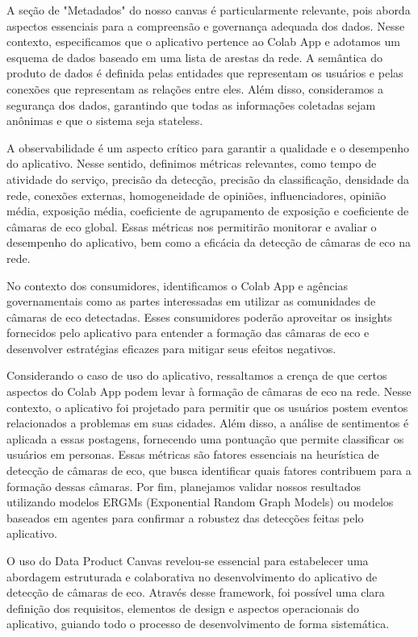A seção de "Metadados" do nosso canvas é particularmente relevante, pois aborda aspectos essenciais para a compreensão e governança adequada dos dados. Nesse contexto, especificamos que o aplicativo pertence ao Colab App e adotamos um esquema de dados baseado em uma lista de arestas da rede. A semântica do produto de dados é definida pelas entidades que representam os usuários e pelas conexões que representam as relações entre eles. Além disso, consideramos a segurança dos dados, garantindo que todas as informações coletadas sejam anônimas e que o sistema seja stateless.

A observabilidade é um aspecto crítico para garantir a qualidade e o desempenho do aplicativo. Nesse sentido, definimos métricas relevantes, como tempo de atividade do serviço, precisão da detecção, precisão da classificação, densidade da rede, conexões externas, homogeneidade de opiniões, influenciadores, opinião média, exposição média, coeficiente de agrupamento de exposição e coeficiente de câmaras de eco global. Essas métricas nos permitirão monitorar e avaliar o desempenho do aplicativo, bem como a eficácia da detecção de câmaras de eco na rede.

No contexto dos consumidores, identificamos o Colab App e agências governamentais como as partes interessadas em utilizar as comunidades de câmaras de eco detectadas. Esses consumidores poderão aproveitar os insights fornecidos pelo aplicativo para entender a formação das câmaras de eco e desenvolver estratégias eficazes para mitigar seus efeitos negativos.

Considerando o caso de uso do aplicativo, ressaltamos a crença de que certos aspectos do Colab App podem levar à formação de câmaras de eco na rede. Nesse contexto, o aplicativo foi projetado para permitir que os usuários postem eventos relacionados a problemas em suas cidades. Além disso, a análise de sentimentos é aplicada a essas postagens, fornecendo uma pontuação que permite classificar os usuários em personas. Essas métricas são fatores essenciais na heurística de detecção de câmaras de eco, que busca identificar quais fatores contribuem para a formação dessas câmaras. Por fim, planejamos validar nossos resultados utilizando modelos ERGMs (Exponential Random Graph Models) ou modelos baseados em agentes para confirmar a robustez das detecções feitas pelo aplicativo.

O uso do Data Product Canvas revelou-se essencial para estabelecer uma abordagem estruturada e colaborativa no desenvolvimento do aplicativo de detecção de câmaras de eco. Através desse framework, foi possível uma clara definição dos requisitos, elementos de design e aspectos operacionais do aplicativo, guiando todo o processo de desenvolvimento de forma sistemática.

